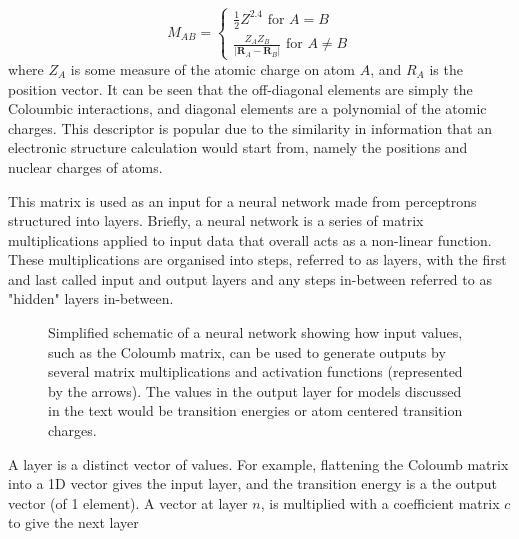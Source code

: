 \begin{equation}
	M_{AB} = 
	  \begin{cases}
		\frac{1}{2} Z^{2.4} \text{ for } A = B\\
		\frac{Z_A Z_B}{\left\lvert \mathbf{R}_A - \mathbf{R}_B\right\rvert} \text{ for } A \neq B
	  \end{cases}
\end{equation}
%
where $Z_A$ is some measure of the atomic charge on atom $A$, and $R_A$ is the position
vector. It can be seen that the off-diagonal elements are simply the Coloumbic interactions,
and diagonal elements are a polynomial of the atomic charges. This descriptor is
popular due to the similarity in information that an electronic structure calculation
would start from, namely the positions and nuclear charges of atoms.

This matrix is used as an input for a neural network made from perceptrons structured
into layers. Briefly, a neural network is a series of matrix multiplications applied
to input data that overall acts as a non-linear function. These multiplications 
are organised into steps, referred to as layers, with the first and last called 
input and output layers and any steps in-between referred to as "hidden" layers in-between.

\begin{figure}
	\centering
	\begin{neuralnetwork}[height=4]
        \hiddenlayer[count=4, bias=false, title=Hidden\\layer 1] \linklayers
        \hiddenlayer[count=3, bias=false, title=Hidden\\layer 2] \linklayers
        \outputlayer[count=2, title=Output\\layer] \linklayers
	\end{neuralnetwork}
	\label{fig:neural_network}
	\caption{Simplified schematic of a neural network showing how input values,
	such as the Coloumb matrix, can be used to generate outputs by several matrix
	multiplications and activation functions (represented by the arrows). The values
	in the output layer for models discussed in the text would be \Qy transition
	energies or atom centered transition charges.}
\end{figure}

A layer is a distinct vector of values. For example, flattening the Coloumb matrix
into a 1D vector gives the input layer, and the \Qy transition energy is a the output 
vector (of 1 element). A vector at layer $n$, is multiplied with a coefficient matrix 
$c$ to give the next layer

